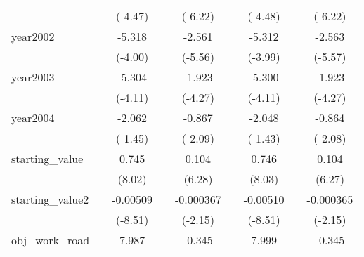 {\begin{tabular}{l*{8}{c}}
            &                     &     (-4.47)         &                     &     (-6.22)         &                     &     (-4.48)         &                     &     (-6.22)         \\
[1em]
year2002    &                     &      -5.318\sym{***}&                     &      -2.561\sym{***}&                     &      -5.312\sym{***}&                     &      -2.563\sym{***}\\
            &                     &     (-4.00)         &                     &     (-5.56)         &                     &     (-3.99)         &                     &     (-5.57)         \\
[1em]
year2003    &                     &      -5.304\sym{***}&                     &      -1.923\sym{***}&                     &      -5.300\sym{***}&                     &      -1.923\sym{***}\\
            &                     &     (-4.11)         &                     &     (-4.27)         &                     &     (-4.11)         &                     &     (-4.27)         \\
[1em]
year2004    &                     &      -2.062         &                     &      -0.867\sym{*}  &                     &      -2.048         &                     &      -0.864\sym{*}  \\
            &                     &     (-1.45)         &                     &     (-2.09)         &                     &     (-1.43)         &                     &     (-2.08)         \\
[1em]
starting\_value&                     &       0.745\sym{***}&                     &       0.104\sym{***}&                     &       0.746\sym{***}&                     &       0.104\sym{***}\\
            &                     &      (8.02)         &                     &      (6.28)         &                     &      (8.03)         &                     &      (6.27)         \\
[1em]
starting\_value2&                     &    -0.00509\sym{***}&                     &   -0.000367\sym{*}  &                     &    -0.00510\sym{***}&                     &   -0.000365\sym{*}  \\
            &                     &     (-8.51)         &                     &     (-2.15)         &                     &     (-8.51)         &                     &     (-2.15)         \\
[1em]
obj\_work\_road&                     &       7.987\sym{***}&                     &      -0.345         &                     &       7.999\sym{***}&                     &      -0.345         \\

\end{tabular}}

